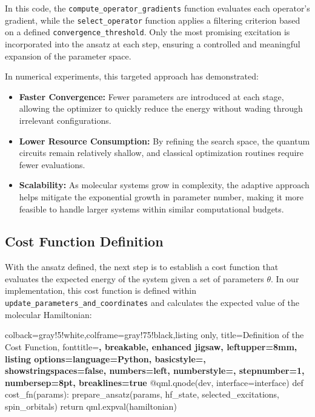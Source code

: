 In this code, the \texttt{compute\_operator\_gradients} function evaluates each operator’s gradient, while the \texttt{select\_operator} function applies a filtering criterion based on a defined \texttt{convergence\_threshold}. Only the most promising excitation is incorporated into the ansatz at each step, ensuring a controlled and meaningful expansion of the parameter space.

In numerical experiments, this targeted approach has demonstrated:
\begin{itemize}
    \item \textbf{Faster Convergence:} Fewer parameters are introduced at each stage, allowing the optimizer to quickly reduce the energy without wading through irrelevant configurations.
    \item \textbf{Lower Resource Consumption:} By refining the search space, the quantum circuits remain relatively shallow, and classical optimization routines require fewer evaluations.
    \item \textbf{Scalability:} As molecular systems grow in complexity, the adaptive approach helps mitigate the exponential growth in parameter number, making it more feasible to handle larger systems within similar computational budgets.
\end{itemize}


\subsection{Cost Function Definition}
With the ansatz defined, the next step is to establish a cost function that evaluates the expected energy of the system given a set of parameters \(\theta\). In our implementation, this cost function is defined within \texttt{update\_parameters\_and\_coordinates} and calculates the expected value of the molecular Hamiltonian:
  
  \begin{tcblisting}{colback=gray!5!white,colframe=gray!75!black,listing only,
    title=Definition of the Cost Function, fonttitle=\bfseries, breakable, enhanced jigsaw, leftupper=8mm,
    listing options={language=Python, basicstyle=\ttfamily\small,
    showstringspaces=false, numbers=left, numberstyle=\footnotesize, stepnumber=1, numbersep=8pt, breaklines=true}}
@qml.qnode(dev, interface=interface)
def cost_fn(params):
    prepare_ansatz(params, hf_state, selected_excitations, spin_orbitals)
    return qml.expval(hamiltonian)
  \end{tcblisting}
  
